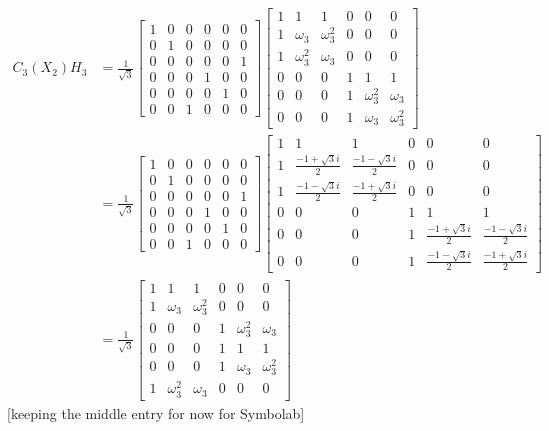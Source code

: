 \begin{align*}
	C_3(X_2)H_3 &=
	\frac{1}{\sqrt{3}}
	\begin{bmatrix}
		1&0&0&0&0&0\\
		0&1&0&0&0&0\\ 
		0&0&0&0&0&1\\ 
		0&0&0&1&0&0\\ 
		0&0&0&0&1&0\\ 
		0&0&1&0&0&0
	\end{bmatrix}
	\begin{bmatrix}
		1&1&1&0&0&0\\ 
		1&\omega_3&\omega_3^2&0&0&0\\ 
		1&\omega_3^2&\omega_3&0&0&0\\ 
		0&0&0&1&1&1\\ 
		0&0&0&1&\omega_3^2&\omega_3\\ 
		0&0&0&1&\omega_3&\omega_3^2
	\end{bmatrix}
	\\&=
	\frac{1}{\sqrt{3}}
	\begin{bmatrix}
		1&0&0&0&0&0\\
		0&1&0&0&0&0\\ 
		0&0&0&0&0&1\\ 
		0&0&0&1&0&0\\ 
		0&0&0&0&1&0\\ 
		0&0&1&0&0&0
	\end{bmatrix}
	\begin{bmatrix}
		1&1&1&0&0&0\\ 
		1&\frac{-1 +\sqrt{3}i}{2}&\frac{-1 -\sqrt{3}i}{2}&0&0&0\\ 
		1&\frac{-1 -\sqrt{3}i}{2}&\frac{-1 +\sqrt{3}i}{2}&0&0&0\\ 
		0&0&0&1&1&1\\ 
		0&0&0&1&\frac{-1 +\sqrt{3}i}{2}&\frac{-1 -\sqrt{3}i}{2}\\ 
		0&0&0&1&\frac{-1 -\sqrt{3}i}{2}&\frac{-1 +\sqrt{3}i}{2}
	\end{bmatrix}
	\\&=
	\frac{1}{\sqrt{3}}
	\begin{bmatrix}
		1&1&1&0&0&0\\ 
		1&\omega_3&\omega_3^2&0&0&0\\
		0&0&0&1&\omega_3^2&\omega_3\\ 
		0&0&0&1&1&1\\ 
		0&0&0&1&\omega_3&\omega_3^2\\
		1&\omega_3^2&\omega_3&0&0&0
	\end{bmatrix}
\end{align*}
[keeping the middle entry for now for Symbolab]


